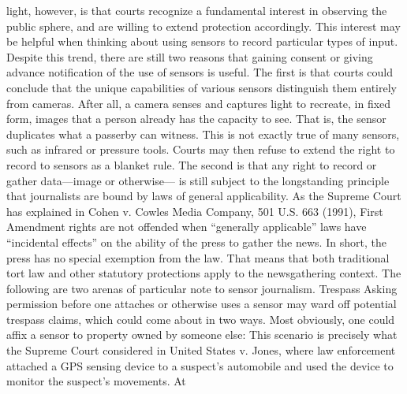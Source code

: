 light, however, is that courts recognize a fundamental interest in observing
the public sphere, and are willing to extend protection accordingly. This
interest may be helpful when thinking about using sensors to record particular
types of input.
Despite this trend, there are still two reasons that gaining consent or giving
advance notification of the use of sensors is useful. The first is that courts
could conclude that the unique capabilities of various sensors distinguish
them entirely from cameras. After all, a camera senses and captures light
to recreate, in fixed form, images that a person already has the capacity to
see. That is, the sensor duplicates what a passerby can witness. This is not
exactly true of many sensors, such as infrared or pressure tools. Courts may
then refuse to extend the right to record to sensors as a blanket rule.
The second is that any right to record or gather data—image or otherwise—
is still subject to the longstanding principle that journalists are bound by
laws of general applicability. As the Supreme Court has explained in Cohen
v. Cowles Media Company, 501 U.S. 663 (1991), First Amendment rights are
not offended when ``generally applicable'' laws have ``incidental effects'' on
the ability of the press to gather the news. In short, the press has no special
exemption from the law. That means that both traditional tort law and other
statutory protections apply to the newsgathering context. The following are
two arenas of particular note to sensor journalism.
Trespass
Asking permission before one attaches or otherwise uses a sensor may ward
off potential trespass claims, which could come about in two ways. Most
obviously, one could affix a sensor to property owned by someone else: This
scenario is precisely what the Supreme Court considered in United States v.
Jones, where law enforcement attached a GPS sensing device to a suspect's
automobile and used the device to monitor the suspect's movements. At

